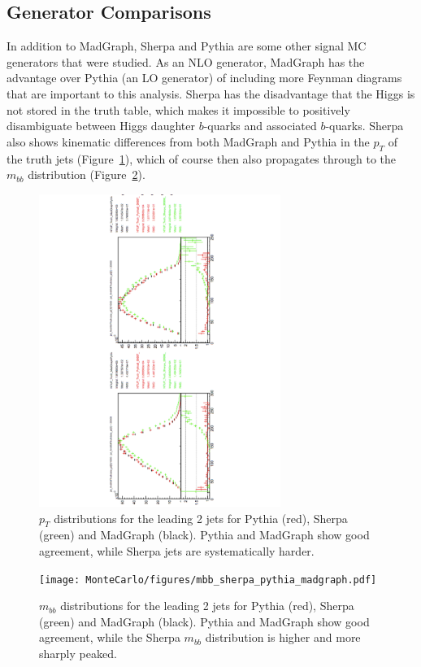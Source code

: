 \subsection{Generator Comparisons}
In addition to MadGraph, Sherpa and Pythia are some other signal MC generators that 
were studied.  As an NLO generator, MadGraph has the advantage over Pythia (an LO generator) of including
more Feynman diagrams that are important to this analysis.  Sherpa has the disadvantage that
the Higgs is not stored in the truth table, which makes it impossible to positively
disambiguate between Higgs daughter $b$-quarks and associated $b$-quarks.  Sherpa
also shows kinematic differences from both MadGraph and Pythia in the $p_T$ of the truth
jets (Figure~\ref{fig:sig_gen_compare}), which of course then also propagates through to the $m_{bb}$ distribution
(Figure~\ref{fig:mbb_sherpa_pythia_madgraph}).


\begin{figure}
  \center
  \includegraphics[width=0.7\textwidth, angle=270]{MonteCarlo/figures/sig_gen_compare.pdf}
  \caption{$p_T$ distributions for the leading 2 jets for Pythia (red), Sherpa (green) and MadGraph (black).  
  Pythia and MadGraph show good agreement, while Sherpa jets are systematically harder.  \label{fig:sig_gen_compare}}
\end{figure}
\begin{figure}
  \center
  \texttt{[image: MonteCarlo/figures/mbb\_sherpa\_pythia\_madgraph.pdf]}
  \caption{$m_{bb}$ distributions for the leading 2 jets for Pythia (red), Sherpa (green) and MadGraph (black).  
  Pythia and MadGraph show good agreement, while the Sherpa $m_{bb}$ distribution is higher and more sharply peaked. \label{fig:mbb_sherpa_pythia_madgraph}}
\end{figure}

